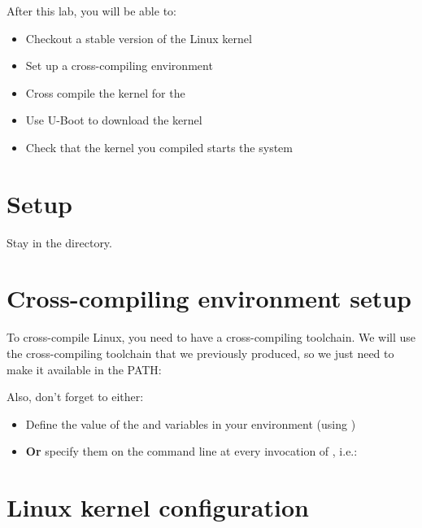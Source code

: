 
After this lab, you will be able to:
\begin{itemize}
\item Checkout a stable version of the Linux kernel
\item Set up a cross-compiling environment
\item Cross compile the kernel for the \labboarddescription
\item Use U-Boot to download the kernel
\item Check that the kernel you compiled starts the system
\end{itemize}

\section{Setup}

Stay in the  directory.

\section{Cross-compiling environment setup}

To cross-compile Linux, you need to have a cross-compiling
toolchain. We will use the cross-compiling toolchain that we
previously produced, so we just need to make it available in the PATH:


Also, don't forget to either:

\begin{itemize}
\item Define the value of the  and 
  variables in your environment (using )
\item {\bf Or} specify them on the command line at every invocation of
  , i.e.: 
\end{itemize}

\section{Linux kernel configuration}

